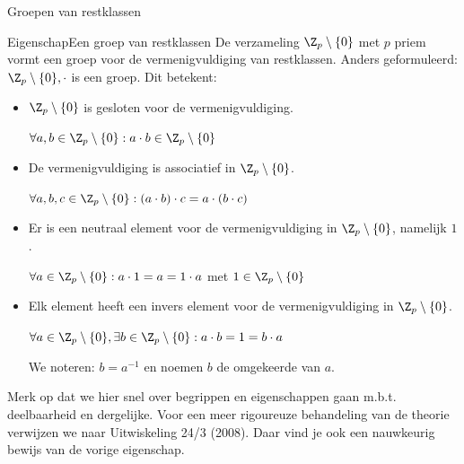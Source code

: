 \begin{lesactiviteit}{Groepen van restklassen}
	
		\begin{kader}{Eigenschap}{Een groep van restklassen}
		De verzameling $\Z_p\setminus \{0\}$ met $p$ priem vormt een groep voor de vermenigvuldiging van restklassen. Anders geformuleerd: $\Z_p\setminus \{0\},\cdot$ is een groep. Dit betekent:
		\begin{itemize}
			\item $\Z_p\setminus \{0\}$ is gesloten voor de vermenigvuldiging.\par
			$\forall a,b \in \Z_p\setminus \{0\}: a\cdot b \in \Z_p\setminus \{0\}$
			\item De vermenigvuldiging is associatief in $\Z_p\setminus \{0\}$.\par
			$\forall a,b,c \in \Z_p\setminus \{0\}: (a\cdot b)\cdot c=a\cdot (b\cdot c)$
			\item Er is een neutraal element voor de vermenigvuldiging in $\Z_p\setminus \{0\}$, namelijk $1$.\par
			$\forall a\in \Z_p\setminus \{0\}: a\cdot 1=a=1\cdot a$ met $1\in \Z_p\setminus \{0\}$
			\item Elk element heeft een invers element voor de vermenigvuldiging in $\Z_p\setminus \{0\}$. \par
			$\forall a\in\Z_p\setminus \{0\}, \exists b\in \Z_p\setminus \{0\}: a\cdot b=1=b\cdot a$\par We noteren: $b=a^{-1}$ en noemen $b$ de omgekeerde van $a$. 
		\end{itemize}
	\end{kader}
		
		Merk op dat we hier snel over begrippen en eigenschappen gaan m.b.t. deelbaarheid en dergelijke. Voor een meer rigoureuze behandeling van de theorie verwijzen we naar Uitwiskeling 24/3 (2008). Daar vind je ook een nauwkeurig bewijs van de vorige eigenschap.

\begin{vraagenantwoord}[resume]
				


\end{vraagenantwoord}
\end{lesactiviteit}
